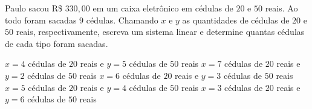 Paulo sacou R\$ $330{,}00$ em um caixa eletrônico em cédulas de $20$ e $50$ reais. Ao todo foram sacadas $9$ cédulas. Chamando $x$ e $y$ as quantidades de cédulas de $20$ e $50$ reais, respectivamente, escreva um sistema linear e determine quantas cédulas de cada tipo foram sacadas.

$x=4$ cédulas de $20$ reais e $y=5$ cédulas de $50$ reais
$x=7$ cédulas de $20$ reais e $y=2$ cédulas de $50$ reais
$x=6$ cédulas de $20$ reais e $y=3$ cédulas de $50$ reais
$x=5$ cédulas de $20$ reais e $y=4$ cédulas de $50$ reais
$x=3$ cédulas de $20$ reais e $y=6$ cédulas de $50$ reais


